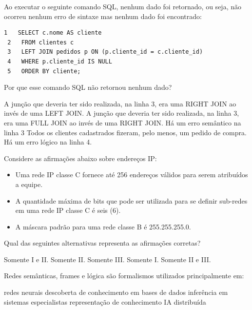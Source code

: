 \documentclass[12pt, addpoints]{exam}
\begin{document}
    \begin{questions}

    \newpage
    \question
Ao executar o seguinte comando SQL, nenhum dado foi retornado, ou seja, não
ocorreu nenhum erro de sintaxe mas nenhum dado foi encontrado:
\begin{tcolorbox}
 \begin{verbatim}1   SELECT c.nome AS cliente
 2   FROM clientes c
 3   LEFT JOIN pedidos p ON (p.cliente_id = c.cliente_id)
 4   WHERE p.cliente_id IS NULL
 5   ORDER BY cliente;
 \end{verbatim}
\end{tcolorbox}
Por que esse comando SQL não retornou nenhum dado?

\begin{choices}
\choice A junção que deveria ter sido realizada, na linha 3, era uma RIGHT JOIN ao invés de uma LEFT JOIN.
\choice A junção que deveria ter sido realizada, na linha 3, era uma FULL JOIN ao invés de uma RIGHT JOIN.
\choice Há um erro semântico na linha 3
\choice Todos os clientes cadastrados fizeram, pelo menos, um pedido de compra.
\choice Há um erro lógico na linha 4.
\end{choices}

\question
Considere as afirmações abaixo sobre endereços IP:
\begin{itemize}
    \item[I.] Uma rede IP classe C fornece até 256 endereços válidos para serem atribuídos a equipe.
    \item[II.] A quantidade máxima de bits que pode ser utilizada para se definir sub-redes em uma rede IP classe C é seis (6).
    \item[III.] A máscara padrão para uma rede classe B é 255.255.255.0.
\end{itemize}
Qual das seguintes alternativas representa as afirmações corretas?
\begin{choices}
\choice Somente I e II.
\choice Somente II.
\choice Somente III.
\choice Somente I.
\choice Somente II e III.
\end{choices}

\question
Redes semânticas, frames e lógica são formalismos utilizados principalmente em: 
\begin{choices}
\choice redes neurais
\choice descoberta de conhecimento em bases de dados
\choice inferência em sistemas especialistas
\choice representação de conhecimento
\choice IA distribuída
\end{choices}


\end{questions}
\end{document}

